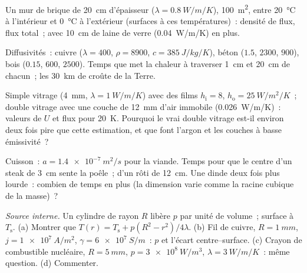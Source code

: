 \begin{exercise}[$\star$]\label{exo:b2:heat-conduction:1}
Un mur de brique de \qty{20}{cm} d'épaisseur ($\lambda = \qty{0.8}{W/m/K}$), \qty{100}{m^2},
entre \qty{20}{\celsius} à l'intérieur et \qty{0}{\celsius} à l'extérieur
(surfaces à ces températures)~: densité de flux, flux total~; avec
\qty{10}{cm} de laine de verre (\qty{0.04}{W/m/K}) en plus.
\end{exercise}

\begin{exercise}[$\star$]\label{exo:b2:heat-conduction:2}
Diffusivités~: cuivre ($\lambda = 400$, $\rho = 8900$, $c = \qty{385}{J/kg/K}$),
béton ($1.5$, $2300$, $900$), bois ($0.15$, $600$, $2500$). Temps que met la chaleur
à traverser \qty{1}{cm} et \qty{20}{cm} de chacun~; les \qty{30}{km} de croûte de
la Terre.
\end{exercise}

\begin{exercise}[$\star$]\label{exo:b2:heat-conduction:3}
Simple vitrage (\qty{4}{mm}, $\lambda = \qty{1}{W/m/K}$) avec des films $h_{\text{i}}
= 8$, $h_{\text{o}} = \qty{25}{W/m^2/K}$~; double vitrage avec une couche de \qty{12}{mm}
d'air immobile (\qty{0.026}{W/m/K})~: valeurs de $U$ et flux pour
\qty{20}{K}. Pourquoi le vrai double vitrage est-il environ deux fois pire que cette
estimation, et que font l'argon et les couches à basse émissivité~?
\end{exercise}

\begin{exercise}[$\star$]\label{exo:b2:heat-conduction:4}
Cuisson~: $a = \qty{1.4e-7}{m^2/s}$ pour la viande. Temps pour que le centre d'un
steak de \qty{3}{cm} sente la poêle~; d'un rôti de \qty{12}{cm}. Une dinde
deux fois plus lourde~: combien de temps en plus (la dimension varie comme la racine cubique
de la masse)~?
\end{exercise}

\begin{exercise}[$\star\star$]\label{exo:b2:heat-conduction:5}
\emph{Source interne.} Un cylindre de rayon $R$ libère $p$ par unité de
volume~; surface à $T_{\text{s}}$. (a) Montrer que $T(r) = T_{\text{s}} +
p(R^2 - r^2)/4\lambda$. (b) Fil de cuivre, $R = \qty{1}{mm}$, $j =
\qty{1e7}{A/m^2}$, $\gamma = \qty{6e7}{S/m}$~: $p$ et l'écart centre--surface.
(c) Crayon de combustible nucléaire, $R = \qty{5}{mm}$, $p = \qty{3e8}{W/m^3}$,
$\lambda = \qty{3}{W/m/K}$~: même question. (d) Commenter.
\end{exercise}

